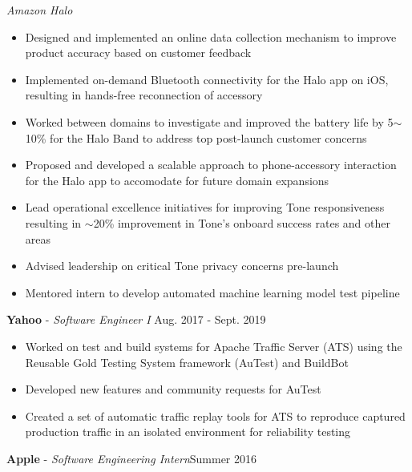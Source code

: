 \documentclass[resmargin]{res}
\begin{document}
\begin{resume}
	{\sl Amazon Halo}
	\begin{itemize}
		\vspace{1mm}
		\item Designed and implemented an online data collection mechanism to improve product accuracy based on customer feedback
		\item Implemented on-demand Bluetooth connectivity for the Halo app on iOS, resulting in hands-free reconnection of accessory
		\item Worked between domains to investigate and improved the battery life by 5$\sim$10\% for the Halo Band to address top post-launch customer concerns
		\item Proposed and developed a scalable approach to phone-accessory interaction for the Halo app to accomodate for future domain expansions
		\item Lead operational excellence initiatives for improving Tone responsiveness resulting in $\sim$20\% improvement in Tone's onboard success rates and other areas
		\item Advised leadership on critical Tone privacy concerns pre-launch
		\item Mentored intern to develop automated machine learning model test pipeline
	\end{itemize}

	{\bf Yahoo} - {\sl Software Engineer I} \hfill Aug. 2017 - Sept. 2019	
	\begin{itemize}
		\vspace{1mm}
		\item Worked on test and build systems for Apache Traffic Server (ATS) using the Reusable Gold Testing System framework (AuTest) and BuildBot
		\item Developed new features and community requests for AuTest
		\item Created a set of automatic traffic replay tools for ATS to reproduce captured production traffic in an isolated environment for reliability testing
	\end{itemize}
	
	{\bf Apple} - {\sl Software Engineering Intern}\hfill Summer 2016
	

\end{resume}
\end{document}
